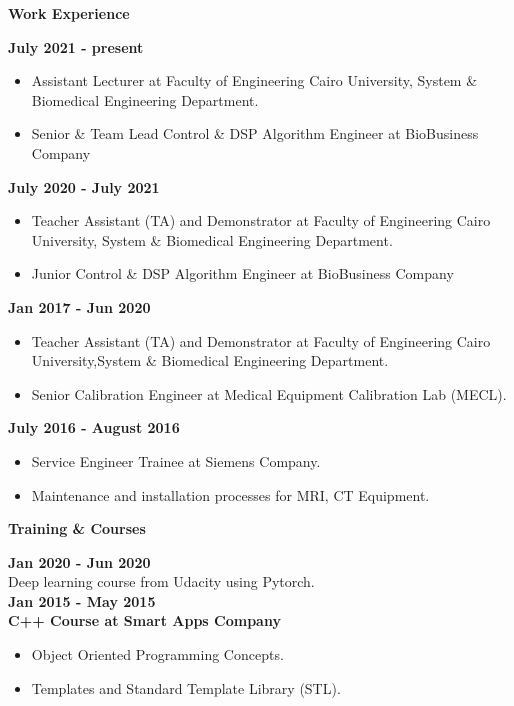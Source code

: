\documentclass[a4paper,12pt,final]{memoir}
\newcommand{\Sep}{\vspace{1.5em}}
\newcommand{\SmallSep}{\vspace{0.5em}}
\newcommand{\CVSection}[1]
	{\Large\textbf{#1}\par
	\SmallSep\normalsize\normalfont}
\newcommand{\CVItem}[1]
	{\textbf{\color{RoyalBlue} #1}}
\begin{document}
\CVSection{Work Experience}
\CVItem{July 2021 - present}\\
\begin{itemize}
  \item Assistant Lecturer at Faculty of Engineering Cairo University, System \& Biomedical Engineering Department.
  \item Senior \& Team Lead Control \& DSP Algorithm Engineer at BioBusiness Company
\end{itemize}
\SmallSep
\CVItem{July 2020 - July 2021}\\
\begin{itemize}
  \item Teacher Assistant (TA) and Demonstrator at Faculty of Engineering Cairo University, System \& Biomedical Engineering Department.
  \item Junior Control \& DSP Algorithm Engineer at BioBusiness Company
\end{itemize}
\SmallSep
\CVItem{Jan 2017 - Jun 2020}\\
\begin{itemize}
  \item Teacher Assistant (TA) and Demonstrator at Faculty of Engineering Cairo University,System \& Biomedical Engineering Department.
  \item Senior Calibration Engineer at Medical Equipment Calibration Lab (MECL).
\end{itemize}
\SmallSep

\CVItem{July 2016 - August 2016}\\
\begin{itemize}
  \item Service Engineer Trainee at Siemens Company.
  \item Maintenance and installation processes for MRI, CT Equipment.
\end{itemize}
\Sep


\clearpage
\framebreak
\framebreak
\CVSection{Training \& Courses}
\CVItem{Jan 2020 - Jun 2020}\\
Deep learning course from Udacity using Pytorch.\\

\CVItem{Jan 2015 - May 2015}\\
\CVItem{C++ Course at Smart Apps Company}
\begin{itemize}
  \item Object Oriented Programming Concepts.
  \item Templates and Standard Template Library (STL).
\end{itemize}
\end{document}
